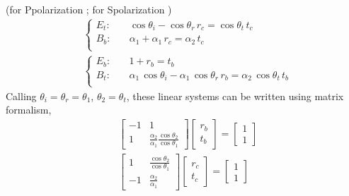 \documentclass[letterpaper,10pt,italian]{jupyterBook}
\begin{document}
\sphinxAtStartPar
(for P\sphinxhyphen{}polarization  ; for S\sphinxhyphen{}polarization  )
\begin{equation*}
\begin{split}
& \begin{cases}
 E_t: & \quad  \cos \theta_i -  \cos \theta_r \, r_c = \cos \theta_{t} \, t_c \\
 B_b: & \quad  \alpha_1      +  \alpha_1      \, r_c =  \alpha_2       \, t_c \\
\end{cases}
\\
& \begin{cases}
 E_b: & \quad                          1 +                   r_b =  t_b \\
 B_t: & \quad  \alpha_1 \, \cos \theta_i -  \alpha_1 \, \cos \theta_r \, r_b = \alpha_2 \, \cos \theta_{t} \, t_b \\
\end{cases}
\end{split}
\end{equation*}
\sphinxAtStartPar
Calling \(\theta_i = \theta_r = \theta_1\), \(\theta_2 = \theta_t\), these linear systems can be written using matrix formalism,
\begin{equation*}
\begin{split}
& \begin{bmatrix} -1 & 1 \\ 1 & \frac{\alpha_2}{\alpha_1} \frac{\cos \theta_2}{\cos \theta_1} \end{bmatrix}
 \begin{bmatrix} r_b \\ t_b \end{bmatrix} = \begin{bmatrix} 1 \\ 1 \end{bmatrix}
\\
& \begin{bmatrix} 1 & \frac{\cos \theta_2}{\cos \theta_1} \\ -1 & \frac{\alpha_2}{\alpha_1} \end{bmatrix}
 \begin{bmatrix} r_c \\ t_c \end{bmatrix} = \begin{bmatrix} 1 \\ 1 \end{bmatrix}
\end{split}
\end{equation*}
\end{document}
